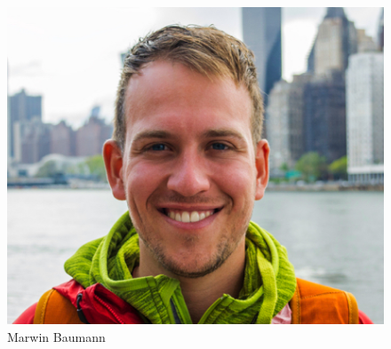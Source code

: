 \documentclass[11pt]{article}
\begin{document}
\begin{figure}[htbp]
\begin{minipage}[b]{0.25\linewidth}
    \includegraphics[width=1.1\linewidth]{marwin.jpg}
    \caption{Marwin Baumann}
  \end{minipage}
\end{figure}
\end{document}
